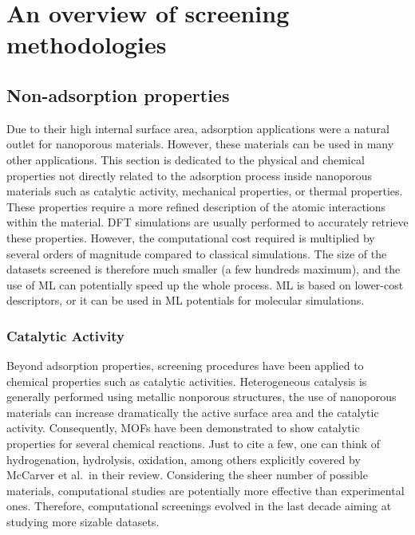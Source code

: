 \documentclass[main.tex]{subfiles}
\begin{document}
\section{An overview of screening methodologies}


\subsection{Non-adsorption properties}

Due to their high internal surface area, adsorption applications were a natural outlet for nanoporous materials. However, these materials can be used in many other applications. This section is dedicated to the physical and chemical properties not directly related to the adsorption process inside nanoporous materials such as catalytic activity,\cite{Singh_2015, Greeley_2006, Back_2020}
mechanical properties,\cite{Chibani_2019, Gaillac_2020}
or thermal properties.\cite{Toher_2014, Sarikurt_2020, Ducamp_2021} These properties require a more refined description of the atomic interactions within the material. DFT simulations are usually performed to accurately retrieve these properties. However, the computational cost required is multiplied by several orders of magnitude compared to classical simulations. The size of the datasets screened is therefore much smaller (a few hundreds maximum), and the use of ML can potentially speed up the whole process. ML is based on lower-cost descriptors,\cite{Evans_2017, Ducamp_2022} or it can be used in ML potentials for molecular simulations\cite{Eckhoff_2019,Friederich_2021}.

\subsubsection{Catalytic Activity}

Beyond adsorption properties, screening procedures have been applied to chemical properties such as catalytic activities. Heterogeneous catalysis is generally performed using metallic nonporous structures, the use of nanoporous materials can increase dramatically the active surface area and the catalytic activity. Consequently, MOFs have been demonstrated to show catalytic properties for several chemical reactions. Just to cite a few, one can think of hydrogenation, hydrolysis, oxidation, among others explicitly covered by McCarver et al.\ in their review.\cite{McCarver_2021}
Considering the sheer number of possible materials, computational studies are potentially more effective than experimental ones. Therefore, computational screenings evolved in the last decade aiming at studying more sizable datasets.
\end{document}
